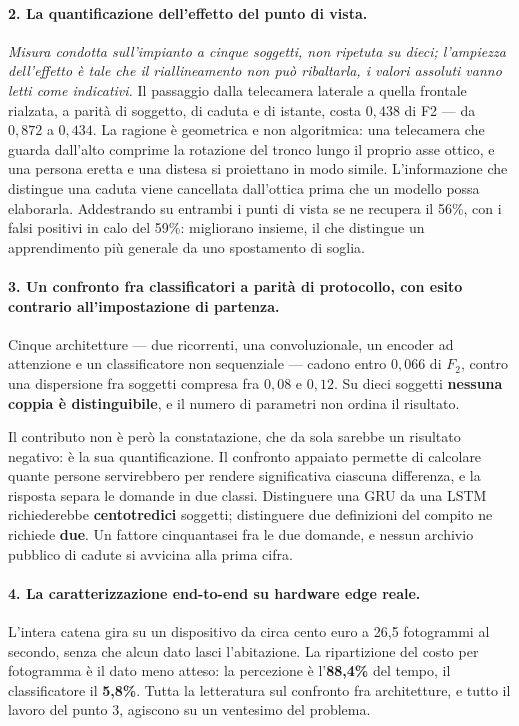 \paragraph{2. La quantificazione dell'effetto del punto di vista.} \emph{Misura condotta sull'impianto a cinque soggetti, non ripetuta su dieci; l'ampiezza dell'effetto è tale che il riallineamento non può ribaltarla, i valori assoluti vanno letti come indicativi.} Il passaggio dalla telecamera laterale a quella frontale rialzata, a parità di soggetto, di caduta e di istante, costa $0{,}438$ di F2 --- da $0{,}872$ a $0{,}434$. La ragione è geometrica e non algoritmica: una telecamera che guarda dall'alto comprime la rotazione del tronco lungo il proprio asse ottico, e una persona eretta e una distesa si proiettano in modo simile. L'informazione che distingue una caduta viene cancellata dall'ottica prima che un modello possa elaborarla. Addestrando su entrambi i punti di vista se ne recupera il 56\%, con i falsi positivi in calo del 59\%: migliorano insieme, il che distingue un apprendimento più generale da uno spostamento di soglia.

\paragraph{3. Un confronto fra classificatori a parità di protocollo, con esito contrario all'impostazione di partenza.} Cinque architetture --- due ricorrenti, una convoluzionale, un encoder ad attenzione e un classificatore non sequenziale --- cadono entro $0{,}066$ di $F_2$, contro una dispersione fra soggetti compresa fra $0{,}08$ e $0{,}12$. Su dieci soggetti \textbf{nessuna coppia è distinguibile}, e il numero di parametri non ordina il risultato.

Il contributo non è però la constatazione, che da sola sarebbe un risultato negativo: è la sua quantificazione. Il confronto appaiato permette di calcolare quante persone servirebbero per rendere significativa ciascuna differenza, e la risposta separa le domande in due classi. Distinguere una GRU da una LSTM richiederebbe \textbf{centotredici} soggetti; distinguere due definizioni del compito ne richiede \textbf{due}. Un fattore cinquantasei fra le due domande, e nessun archivio pubblico di cadute si avvicina alla prima cifra.

\paragraph{4. La caratterizzazione end-to-end su hardware edge reale.} L'intera catena gira su un dispositivo da circa cento euro a 26,5 fotogrammi al secondo, senza che alcun dato lasci l'abitazione. La ripartizione del costo per fotogramma è il dato meno atteso: la percezione è l'\textbf{88,4\%} del tempo, il classificatore il \textbf{5,8\%}. Tutta la letteratura sul confronto fra architetture, e tutto il lavoro del punto 3, agiscono su un ventesimo del problema.

